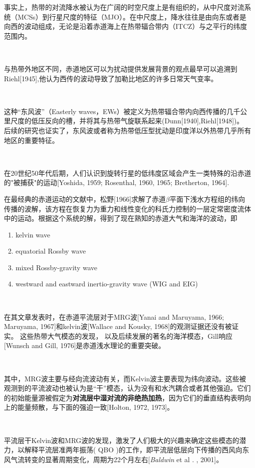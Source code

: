 \documentclass{article}
\begin{document}
\begin{CJK*}{UTF8}{gbsn}
事实上，热带的对流降水被认为在广阔的时空尺度上是有组织的，从中尺度对流系统（MCSs）到行星尺度的特征（MJO）。在中尺度上，降水往往是由向东或者是向西的波动组成，无论是沿着赤道海上在热带辐合带内（ITCZ）与之平行的纬度范围内。

\ 


与热带外地区不同，赤道地区可以为扰动提供发展背景的观点最早可以追溯到Riehl[1945],他认为西传的波动导致了加勒比地区的许多日常天气变率。

\

这种“东风波”（Easterly waves，EWs）被定义为热带辐合带内向西传播的几千公里尺度的低压反向的槽，并将其与热带气旋联系起来(Dunn[1940],Riehl[1948])。
后续的研究也证实了，东风波或者称为热带低压型扰动是印度洋以外热带几乎所有地区的重要特征。

\ 

在20世纪50年代后期，人们认识到旋转行星的低纬度区域会产生一类特殊的沿赤道的"被捕获"的运动[Yoshida, 1959; Rosenthal, 1960, 1965; Bretherton, 1964].

在最经典的赤道运动的文献中，松野[1966]求解了赤道$\beta$平面下浅水方程组的纬向传播的波解，该方程在恢复力为重力和线性变化的科氏力控制的一层定常密度流体中的运动。根据这个系统的解，得到了现在熟知的赤道大气和海洋的波动，即
\begin{enumerate}
    \item 
    kelvin wave
    \item
    equatorial Rossby wave
    \item
    mixed Rossby-gravity  wave
    \item
    westward and eastward inertio-gravity wave (WIG and EIG)
\end{enumerate}

\ 


在其文章发表时，在赤道平流层对于MRG波[Yanai and Maruyama, 1966; Maruyama, 1967]和kelvin波[Wallace and Kousky, 1968]的观测证据还没有被证实。
这些热带大气模态的发现， 以及后续发展的著名的海洋模态，Gill响应[Wunsch and Gill, 1976]是赤道浅水理论的重要突破。

\

其中，MRG波主要与经向流波动有关，而Kelvin波主要表现为纬向波动。这些被观测到的平流波动也被认为是“干”模态，认为没有和水汽耦合或者其他强迫。它们的初始能量源被假定为\textbf{对流层中湿对流的非绝热加热}，因为它们的垂直结构表明向上的能量频散，与下面的强迫一致[Holton, 1972, 1973]。

\ 

平流层干Kelvin波和MRG波的发现，激发了人们极大的兴趣来确定这些模态的潜力，以解释平流层准两年振荡( QBO )的工作，即平流层低层向下传播的西风向东风气流转变的显著周期变化，周期为22个月左右[\textit{Baldwin} et al . , 2001]。


\end{CJK*}
\end{document}
